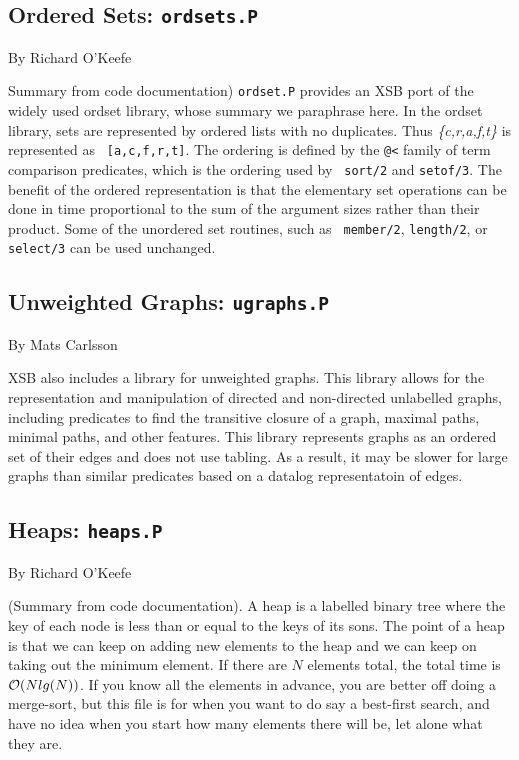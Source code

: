 \subsection{Ordered Sets: {\tt ordsets.P}}
By Richard O'Keefe

%
{Summary from code documentation) {\tt ordset.P} provides an XSB port
  of the widely used ordset library, whose summary we paraphrase here.
  In the ordset library, sets are represented by ordered lists with no
  duplicates.  Thus {\em \{c,r,a,f,t\}} is represented as {\tt
    [a,c,f,r,t]}.  The ordering is defined by the \verb|@<| family of
  term comparison predicates, which is the ordering used by {\tt
    sort/2} and {\tt setof/3}.  The benefit of the ordered
  representation is that the elementary set operations can be done in
  time proportional to the sum of the argument sizes rather than their
  product.  Some of the unordered set routines, such as {\tt
    member/2}, {\tt length/2}, or {\tt select/3} can be used
  unchanged.

\subsection{Unweighted Graphs: {\tt ugraphs.P}}

By Mats Carlsson

%
XSB also includes a library for unweighted graphs.  This library
allows for the representation and manipulation of directed and
non-directed unlabelled graphs, including predicates to find the
transitive closure of a graph, maximal paths, minimal paths, and other
features.  This library represents graphs as an ordered set of their
edges and does not use tabling.  As a result, it may be slower for
large graphs than similar predicates based on a datalog representatoin
of edges.

\subsection{Heaps: {\tt heaps.P}}

By Richard O'Keefe

(Summary from code documentation).  A heap is a labelled binary tree
where the key of each node is less than or equal to the keys of its
sons.  The point of a heap is that we can keep on adding new elements
to the heap and we can keep on taking out the minimum element.  If
there are $N$ elements total, the total time is ${\cal O} (Nlg(N))$.  If
you know all the elements in advance, you are better off doing a
merge-sort, but this file is for when you want to do say a best-first
search, and have no idea when you start how many elements there will
be, let alone what they are.

}
